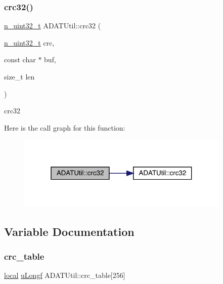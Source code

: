 \subsubsection{\texorpdfstring{crc32()}{crc32()}\hspace{0.1cm}{\footnotesize\ttfamily [2/2]}}
{\footnotesize\ttfamily \mbox{\hyperlink{namespaceADATUtil_ad945a8afa4db2d1f89b731964adae97e}{n\+\_\+uint32\+\_\+t}} A\+D\+A\+T\+Util\+::crc32 (\begin{DoxyParamCaption}\item[{\mbox{\hyperlink{namespaceADATUtil_ad945a8afa4db2d1f89b731964adae97e}{n\+\_\+uint32\+\_\+t}}}]{crc,  }\item[{const char $\ast$}]{buf,  }\item[{size\+\_\+t}]{len }\end{DoxyParamCaption})}



crc32 

Here is the call graph for this function\+:\nopagebreak
\begin{figure}[H]
\begin{center}
\leavevmode
\includegraphics[width=289pt]{de/d19/namespaceADATUtil_aea7a30b468249f17899ebbb9902fb330_cgraph}
\end{center}
\end{figure}


\subsection{Variable Documentation}
\mbox{\label{namespaceADATUtil_abfc0fdaa6ec59bc44e1eb27433d2d024}} 
\subsubsection{\texorpdfstring{crc\_table}{crc\_table}}
{\footnotesize\ttfamily \mbox{\hyperlink{adat__crc32_8cc_a08023ea6765c99d60a6a3840cd07156e}{local}} \mbox{\hyperlink{namespaceADATUtil_adf7f8db2cc2f19fe6143cf8a2ad881f4}{u\+Longf}} A\+D\+A\+T\+Util\+::crc\+\_\+table\mbox{[}256\mbox{]}}

